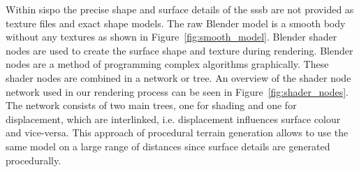 \begin{table}[htb]
    \centering
    \caption{Input parameters that define an instrument in \gls{sispo}.}
    \label{tab:inst_input}
\end{table}

Within \gls{sispo} the precise shape and surface details of the \gls{sssb} are not provided as texture files and exact shape models. The raw Blender model is a smooth body without any textures as shown in Figure~\ref{fig:smooth_model}. Blender shader nodes are used to create the surface shape and texture during rendering. Blender nodes are a method of programming complex algorithms graphically. These shader nodes are combined in a network or tree. An overview of the shader node network used in our rendering process can be seen in Figure~\ref{fig:shader_nodes}. The network consists of two main trees, one for shading and one for displacement, which are interlinked, i.e. displacement influences surface colour and vice-versa. This approach of procedural terrain generation allows to use the same model on a large range of distances since surface details are generated procedurally.

